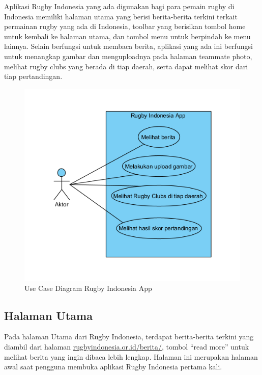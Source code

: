 Aplikasi Rugby Indonesia yang ada digunakan bagi para pemain rugby di Indonesia memiliki halaman utama yang berisi berita-berita terkini terkait permainan rugby yang ada di Indonesia, toolbar yang berisikan tombol home untuk kembali ke halaman utama, dan tombol menu untuk berpindah ke menu lainnya. Selain berfungsi untuk membaca berita, aplikasi yang ada ini berfungsi untuk menangkap gambar dan menguploadnya pada halaman teammate photo, melihat rugby clubs yang berada di tiap daerah, serta dapat melihat skor dari tiap pertandingan.

\begin{figure} [!h]
    \centering
    \includegraphics{Gambar/Existing-UCD-Rugby-App.png}
    \caption{Use Case Diagram Rugby Indonesia App}
    \label{fig:ucd-rugby-indonesia-app}
\end{figure}

\subsection{Halaman Utama}
Pada halaman Utama dari Rugby Indonesia, terdapat berita-berita terkini yang diambil dari halaman \url{rugbyindonesia.or.id/berita/}, tombol ``read more'' untuk melihat berita yang ingin dibaca lebih lengkap. Halaman ini merupakan halaman awal saat pengguna membuka aplikasi Rugby Indonesia pertama kali. 

